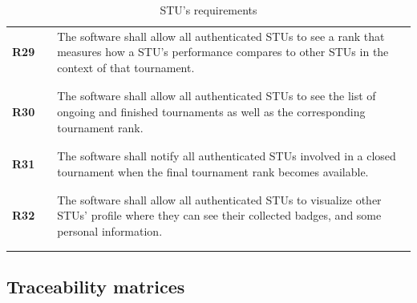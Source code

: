 \begin{longtable}[H]{l l p{12cm}}
    \textbf{R29} & \vline & The software shall allow all authenticated STUs to see a rank that measures how a STU's performance compares to other STUs in the context of that tournament.                                                         \\
                 &        &                                                                                                                                                                                                                       \\\hline & & \\
    \textbf{R30} & \vline & The software shall allow all authenticated STUs to see the list of ongoing and finished tournaments as well as the corresponding tournament rank.                                                                     \\
                 &        &                                                                                                                                                                                                                       \\\hline & & \\
    \textbf{R31} & \vline & The software shall notify all authenticated STUs involved in a closed tournament when the final tournament rank becomes available.                                                                                    \\
                 &        &                                                                                                                                                                                                                       \\\hline & & \\
    \textbf{R32} & \vline & The software shall allow all authenticated STUs to visualize other STUs' profile where they can see their collected badges, and some personal information.                                                            \\
                 &        &                                                                                                                                                                                                                       \\
    \hline
    \caption{STU's requirements}
\end{longtable}

\subsection{Traceability matrices}

